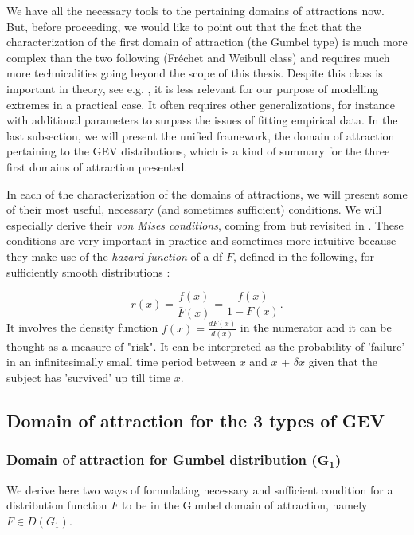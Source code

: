 We have all the necessary tools to  the pertaining domains of attractions now. But, before proceeding, we would like to point out that the fact that the characterization of the first domain of attraction (the Gumbel type)  is much more complex than the two following (Fréchet and Weibull class) and requires much more technicalities going beyond the scope of this thesis. Despite this class is important in theory, see e.g. \cite{pinheiro_comparative_2015}, it is less relevant for our purpose of modelling extremes in a practical case. It often requires other generalizations, for instance with additional parameters to surpass the issues of fitting empirical data. In the last subsection, we will present the unified framework, the domain of attraction pertaining to the GEV distributions, which is a kind of summary for the three first domains of attraction presented.


In each of the characterization of the domains of attractions, we will present some of their most useful, necessary (and sometimes sufficient) conditions. We will especially derive their \emph{von Mises conditions}, coming from \cite{von_mises_distribution_1936} but revisited in \cite{falk_von_1993}. These conditions are very important in practice and sometimes more intuitive because they make use of the \emph{hazard function} of a df $F$, defined in the following, for sufficiently smooth distributions :

\begin{equation}\label{haz}
r(x)=\frac{f(x)}{\bar{F}(x)}= \frac{f(x)}{1-F(x)}.
\end{equation}
It involves the density function $f(x)=\frac{dF(x)}{d(x)}$ in the numerator and it can be thought as a measure of "risk". It can be interpreted as the probability of 'failure' in an infinitesimally small time period between $x$ and $x$ + $\delta x$ given
that the subject has 'survived' up till time $x$.

\subsection{Domain of attraction for the 3 types of GEV}


\subsubsection*{Domain of attraction for Gumbel distribution ($\mathbf{G_1}$) }  We derive here two ways of formulating necessary and sufficient condition for a distribution function $F$ to be in the Gumbel domain of attraction, namely $F\in D(G_1)$.

